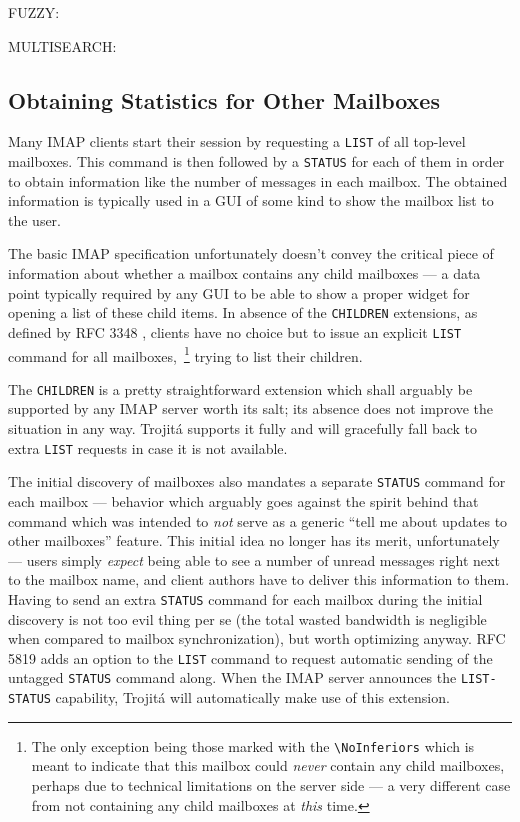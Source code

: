 \documentclass[trojita]{subfiles}
\begin{document}
FUZZY: \cite{rfc6203}

MULTISEARCH: \cite{rfc6237}

\subsection{Obtaining Statistics for Other Mailboxes}

Many IMAP clients start their session by requesting a {\tt LIST} of all top-level mailboxes.  This command is then
followed by a {\tt STATUS} for each of them in order to obtain information like the number of messages in each mailbox.
The obtained information is typically used in a GUI of some kind to show the mailbox list to the user.

The basic IMAP specification unfortunately doesn't convey the critical piece of information about whether a mailbox
contains any child mailboxes --- a data point typically required by any GUI to be able to show a proper widget for
opening a list of these child items.  In absence of the {\tt CHILDREN} extensions, as defined by RFC 3348
\cite{rfc3348}, clients have no choice but to issue an explicit {\tt LIST} command for all mailboxes,~\footnote{The only
exception being those marked with the {\tt {\textbackslash}NoInferiors} which is meant to indicate that this mailbox
could {\em never} contain any child mailboxes, perhaps due to technical limitations on the server side --- a very
different case from not containing any child mailboxes at {\em this} time.} trying to list their children.

The {\tt CHILDREN} is a pretty straightforward extension which shall arguably be supported by any IMAP server worth its
salt; its absence does not improve the situation in any way.  Trojitá supports it fully and will gracefully fall back to
extra {\tt LIST} requests in case it is not available.

The initial discovery of mailboxes also mandates a separate {\tt STATUS} command for each mailbox --- behavior which
arguably goes against the spirit behind that command which was intended to {\em not} serve as a generic ``tell me about
updates to other mailboxes'' feature.  This initial idea no longer has its merit, unfortunately --- users simply {\em
expect} being able to see a number of unread messages right next to the mailbox name, and client authors have to deliver
this information to them.  Having to send an extra {\tt STATUS} command for each mailbox during the initial discovery is
not too evil thing per se (the total wasted bandwidth is negligible when compared to mailbox synchronization), but worth
optimizing anyway.  RFC 5819 \cite{rfc5819} adds an option to the {\tt LIST} command to request automatic sending of the
untagged {\tt STATUS} command along.  When the IMAP server announces the {\tt LIST-STATUS} capability, Trojitá will
automatically make use of this extension.
\end{document}
